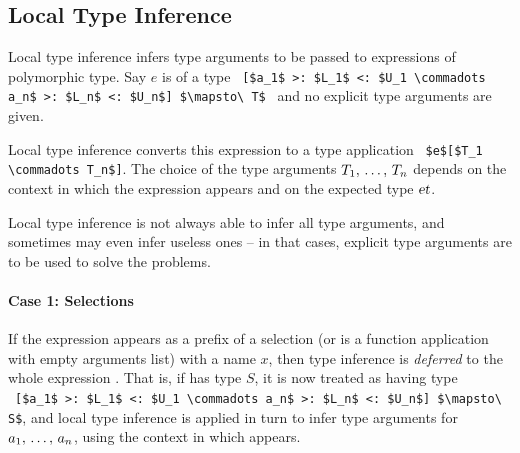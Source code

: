 






\subsection{Local Type Inference}
\label{sec:local-type-inference}

Local type inference infers type arguments to be passed to expressions of polymorphic type. Say $e$ is of a type ~\lstinline![$a_1$ >: $L_1$ <: $U_1 \commadots a_n$ >: $L_n$ <: $U_n$] $\mapsto\ T$!~ and no explicit type arguments are given. 

Local type inference converts this expression to a type application ~\lstinline!$e$[$T_1 \commadots T_n$]!. The choice of the type arguments $T_1 ,\, \ldots ,\, T_n$ depends on the context in which the expression appears and on the expected type $\mbox{\sl et}$. 

Local type inference is not always able to infer all type arguments, and sometimes may even infer useless ones -- in that cases, explicit type arguments are to be used to solve the problems. 

\paragraph{Case 1: Selections}
If the expression appears as a prefix of a selection (or is a function application with empty arguments list) with a name $x$, then type inference is {\em deferred} to the whole expression . That is, if  has type $S$, it is now treated as having type ~\lstinline![$a_1$ >: $L_1$ <: $U_1 \commadots a_n$ >: $L_n$ <: $U_n$] $\mapsto\ S$!, and local type inference is applied in turn to infer type arguments for $a_1 ,\, \ldots ,\, a_n$, using the context in which  appears. 

